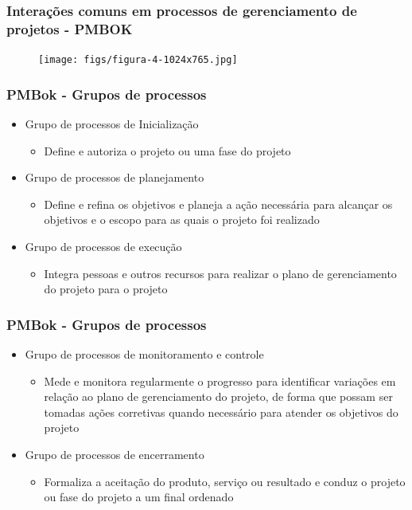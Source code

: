 \begin{frame}
 \frametitle{Interações comuns em processos de gerenciamento de projetos - PMBOK}
  \centering
  \begin{figure}
 \texttt{[image: figs/figura-4-1024x765.jpg]}
\end{figure}
\end{frame}



\begin{frame}
 \frametitle{PMBok - Grupos de processos}
 \begin{itemize}
  \item Grupo de processos de Inicialização
  \begin{itemize}
   \item Define e autoriza o projeto ou uma fase do projeto
  \end{itemize}
  
  \item Grupo de processos de planejamento
  \begin{itemize}
   \item Define e refina os objetivos e planeja a ação necessária para alcançar os objetivos e o escopo para as quais o projeto foi realizado
  \end{itemize}
 
 \item Grupo de processos de execução
  \begin{itemize}
   \item Integra pessoas e outros recursos para realizar o plano de gerenciamento do projeto para o projeto
  \end{itemize}

  \end{itemize}

\end{frame}

\begin{frame}
 \frametitle{PMBok - Grupos de processos}
 \begin{itemize}
  \item Grupo de processos de monitoramento e controle
  \begin{itemize}
   \item Mede e monitora regularmente o progresso para identificar variações em relação ao plano de gerenciamento do projeto, de forma que possam ser tomadas ações
   corretivas quando necessário  para atender os objetivos do projeto
  \end{itemize}
  \item Grupo de processos de encerramento
  \begin{itemize}
   \item Formaliza a aceitação do produto, serviço ou resultado e conduz o projeto ou fase do projeto a um final ordenado
  \end{itemize}
  \end{itemize}

\end{frame}

